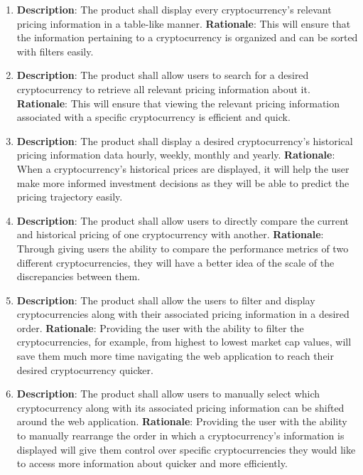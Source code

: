 \documentclass[12pt, titlepage]{article}
\begin{document}
\begin{enumerate}[label = FR-\arabic*, left=\parindent, series=fr]
    \item \textbf{Description}: The product shall display every cryptocurrency's relevant pricing information in a table-like manner.
    \newline \textbf{Rationale}: This will ensure that the information pertaining to a cryptocurrency is organized and can be sorted with filters easily.

    \item \textbf{Description}: The product shall allow users to search for a desired cryptocurrency to retrieve all relevant pricing information about it.
    \newline \textbf{Rationale}: This will ensure that viewing the relevant pricing information associated with a specific cryptocurrency is efficient and quick.

    \item \textbf{Description}: The product shall display a desired cryptocurrency's historical pricing information data hourly, weekly, monthly and yearly.
    \newline \textbf{Rationale}: When a cryptocurrency's historical prices are displayed, it will help the user make more informed investment decisions
    as they will be able to predict the pricing trajectory easily.

    \item \textbf{Description}: The product shall allow users to directly compare the current and historical pricing of one cryptocurrency with another.
    \newline \textbf{Rationale}: Through giving users the ability to compare the performance metrics of two different cryptocurrencies, they will have
    a better idea of the scale of the discrepancies between them. 

    \item \textbf{Description}: The product shall allow the users to filter and display cryptocurrencies along with their associated pricing information in a desired order. 
    \newline \textbf{Rationale}: Providing the user with the ability to filter the cryptocurrencies, for example, from highest to lowest market cap values, will save them much
    more time navigating the web application to reach their desired cryptocurrency quicker. 

    \item \textbf{Description}: The product shall allow users to manually select which cryptocurrency along with its associated pricing information can be shifted around the web application.
    \newline \textbf{Rationale}: Providing the user with the ability to manually rearrange the order in which a cryptocurrency's information is displayed will give them control over specific cryptocurrencies they would like to access more information about quicker and more efficiently.


\end{enumerate}
\end{document}
